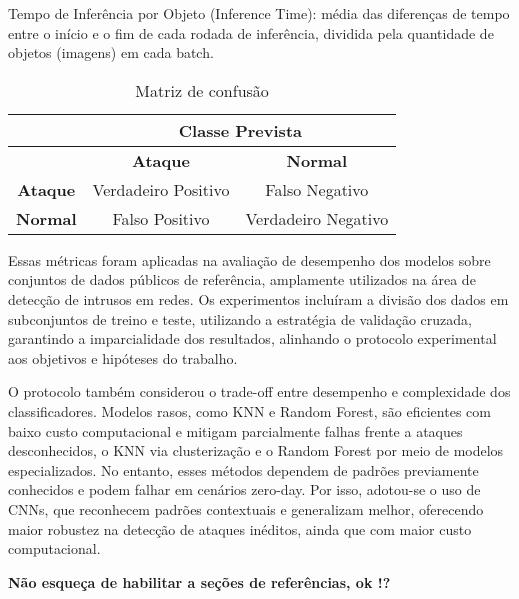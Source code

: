 \documentclass[conference]{IEEEtran}
\begin{document}
    Tempo de Inferência por Objeto (Inference Time): média das diferenças de tempo entre o início e o fim de cada rodada de inferência, dividida pela quantidade de objetos (imagens) em cada batch.
    

    \begin{table}[h]
        \centering
        \renewcommand{\arraystretch}{1.4}
        \begin{tabular}{|c|c|c|}
            \hline
            \rowcolor{gray!30}
            \multicolumn{1}{|c|}{} & \multicolumn{2}{c|}{\textbf{Classe Prevista}} \\ \hline
            \rowcolor{gray!30}
            \textbf & \textbf{Ataque} & \textbf{Normal} \\ \hline
            \textbf{Ataque} & Verdadeiro Positivo & Falso Negativo \\ \hline
            \textbf{Normal} & Falso Positivo & Verdadeiro Negativo \\ \hline
        \end{tabular}
        \caption{Matriz de confusão}
        \label{tab:matriz-confusao}
    \end{table}


    Essas métricas foram aplicadas na avaliação de desempenho dos modelos sobre conjuntos de dados públicos de referência, amplamente utilizados na área de detecção de intrusos em redes. Os experimentos incluíram a divisão dos dados em subconjuntos de treino e teste, utilizando a estratégia de validação cruzada, garantindo a imparcialidade dos resultados, alinhando o protocolo experimental aos objetivos e hipóteses do trabalho.
    
    O protocolo também considerou o trade-off entre desempenho e complexidade dos classificadores. Modelos rasos, como KNN e Random Forest, são eficientes com baixo custo computacional e mitigam parcialmente falhas frente a ataques desconhecidos, o KNN via clusterização e o Random Forest por meio de modelos especializados. No entanto, esses métodos dependem de padrões previamente conhecidos e podem falhar em cenários zero-day. Por isso, adotou-se o uso de CNNs, que reconhecem padrões contextuais e generalizam melhor, oferecendo maior robustez na detecção de ataques inéditos, ainda que com maior custo computacional.





\textbf{Não esqueça de habilitar a seções de referências, ok !?}
\end{document}
